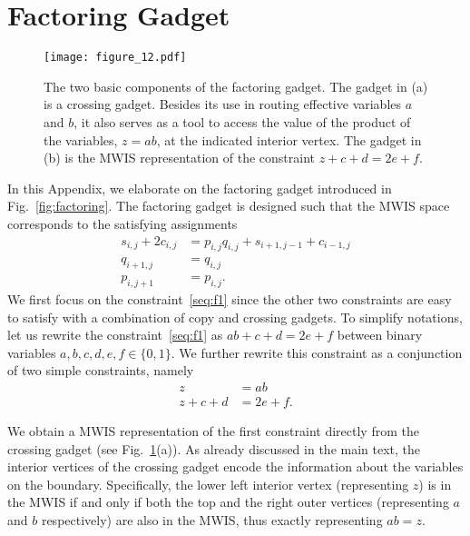 \section{Factoring Gadget}\label{sec:factoringAppendix}

\begin{figure}[b!]
    \texttt{[image: figure\_12.pdf]}
  \caption{The two basic components of the factoring gadget. The gadget in (a) is a crossing gadget. Besides its use in routing effective variables $a$ and $b$, it also serves as a tool to access the value of the product of the variables, $z=ab$, at the indicated interior vertex. The gadget in (b) is the MWIS representation of the constraint $z+c+d=2e+f$.}
    \label{fig:math-gadgets}
\end{figure}

In this Appendix, we elaborate on the factoring gadget introduced in Fig.~\ref{fig:factoring}. The factoring gadget is designed such that the MWIS space corresponds to the satisfying assignments 
\begin{align}
    s_{i,j} + 2c_{i,j} &= p_{i,j}q_{i,j} + s_{i + 1, j - 1} + c_{i - 1, j}\label{seq:f1}\\
    q_{i+1,j}&=q_{i,j}\label{seq:f2}\\
    p_{i,j+1}&=p_{i,j}. \label{seq:f3}
\end{align}
We first focus on the constraint~\eqref{seq:f1} since the other two constraints are easy to satisfy with a combination of copy and crossing gadgets. 
To simplify notations, let us rewrite the constraint~\eqref{seq:f1} as $ab+c+d=2e+f$ between binary variables $a,b,c,d,e,f\in \{0,1\}$. We further rewrite this constraint as a conjunction of two simple constraints, namely 
\begin{align}
z&=ab\\
z+c+d&=2e+f.
\end{align}

We obtain a MWIS representation of the first constraint directly from the crossing gadget (see Fig.~\ref{fig:math-gadgets}(a)). As already discussed in the main text, the interior vertices of the crossing gadget encode the information about the variables on the boundary. Specifically, the lower left interior vertex (representing $z$) is in the MWIS if and only if both the top and the right outer vertices (representing $a$ and $b$ respectively) are also in the MWIS, thus exactly representing $ab=z$.

